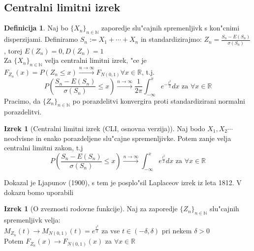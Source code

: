 \documentclass[a4paper,12pt]{article}
\theoremstyle{definition}
\newtheorem{defn}[counter]{Definicija}
\newtheorem{theorem}[counter]{Izrek}
\theoremstyle{remark}
\newcommand{\N}{\mathbb{N}}
\newcommand{\R}{\mathbb{R}}
\begin{document}
\subsection{Centralni limitni izrek}

\begin{defn}
    Naj bo $\{X_n\}_{n \in \N}$ zaporedje slu"cajnih spremenljivk s kon"cnimi disperzijami. Definiramo
    $S_n := X_1 + \cdots + X_n$ in standardizirajmo: $Z_n = \frac{S_n - E(S_n)}{\sigma(S_n)}$, torej
    $E(Z_n) = 0, D(Z_n) = 1$ \\
    Za $\{X_n\}_{n \in \N}$ velja centralni limitni izrek, "ce je $F_{Z_n}(x) = P(Z_n \leq x)
    \stackrel{n \to \infty}{\rightarrow} F_{N(0,1)} \forall x \in \R$, t.j.
    \[P(\frac{S_n - E(S_n)}{\sigma(S_n)} \leq x) \stackrel{n \to \infty}{\rightarrow}
    \frac{1}{2 \pi} \int_{-\infty}^x e^{-\frac{t^2}{2}} dx \text{ za } \forall x \in \R\]
    Pracimo, da $\{Z_n\}_{n \in \N}$ po porazdelitvi konvergira proti standardizirani normalni porazdelitvi.
\end{defn}

\begin{theorem}[Centralni limitni izrek (CLI, osnovna verzija)]
    Naj bodo $X_1, X_2 \cdots$ neodvisne in enako porazdeljene slu"cajne spremenljivke. Potem zanje velja centralni limitni
    zakon, t.j
    \[P(\frac{S_n - E(S_n)}{\sigma(S_n)} \leq x) \stackrel{n \to \infty}{\rightarrow}
    \int_{-\infty}^x e^{\frac{t^2}{2}} dx \text{ za } \forall x \in \R\]
\end{theorem}

Dokazal je Ljapunov (1900), s tem je posplo"sil Laplaceov izrek iz leta 1812. V dokazu bomo uporabili

\begin{theorem}[O zveznosti rodovne funkcije]
    Naj za zaporedje $\{Z_n\}_{n \in \N}$ slu"cajnih spremenljivk velja: \\
    $M_{Z_n}(t) \rightarrow M_{N(0,1)}(t) = e^{\frac{t^2}{2}}$ za vse $t \in (-\delta,\delta)$ pri nekem $\delta > 0$ \\
    Potem $F_{Z_n}(x) \rightarrow F_{N(0,1)}(x)$ za $\forall x \in \R$
\end{theorem}
\end{document}
